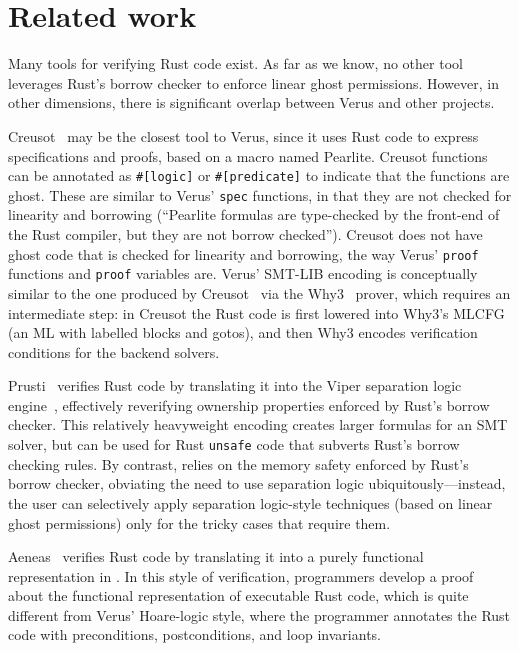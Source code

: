 
\section{Related work}\label{sec:related}

Many tools for verifying Rust code exist.
As far as we know, no other tool leverages Rust's borrow checker to enforce linear ghost permissions.
However, in other dimensions, there is significant overlap between Verus and other projects.

Creusot~\cite{denis:hal-03737878} may be the closest tool to Verus,
since it uses Rust code to express specifications and proofs,
based on a macro named Pearlite.
Creusot functions can be annotated as \verb`#[logic]` or \verb`#[predicate]`
to indicate that the functions are ghost.
These are similar to Verus' \verb`spec` functions,
in that they are not checked for linearity and borrowing
(``Pearlite formulas are type-checked by the front-end of the Rust compiler,
but they are not borrow checked'').
Creusot does not have ghost code that is checked for linearity and borrowing,
the way Verus' \verb`proof` functions and \verb`proof` variables are.
Verus' SMT-LIB encoding is conceptually similar to the one produced 
by Creusot~\cite{denis:hal-03737878} via the Why3~\cite{boogie11why3} prover,
which requires an intermediate step: in Creusot the Rust code is first
lowered into Why3's MLCFG (an ML with labelled blocks and gotos),
and then Why3 encodes verification conditions for the backend solvers.

Prusti~\cite{DBLP:journals/pacmpl/Astrauskas0PS19,DBLP:conf/nfm/AstrauskasBFGMM22}
verifies Rust code by translating it into the Viper separation logic engine~\cite{DBLP:conf/vmcai/0001SS16},
effectively reverifying ownership properties enforced by Rust's borrow checker.
This relatively heavyweight encoding creates larger formulas for an SMT solver,
but can be used for Rust \verb`unsafe` code that subverts Rust's borrow checking rules.
By contrast, \verus relies on the memory safety enforced by Rust's borrow checker,
obviating the need to use separation logic ubiquitously---instead,
the user can selectively apply separation logic-style techniques
(based on linear ghost permissions) only for the tricky cases that require them.

Aeneas~\cite{DBLP:journals/pacmpl/HoP22} verifies Rust code by translating it into a purely functional
representation in \fstar.
In this style of verification,
programmers develop a proof about the functional representation of executable Rust code,
which is quite different from Verus' Hoare-logic style,
where the programmer annotates the Rust code with preconditions, postconditions, and loop invariants.

